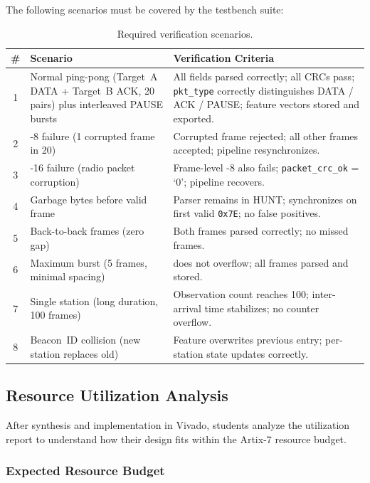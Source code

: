 \documentclass[11pt,letterpaper]{article}
\begin{document}
	The following scenarios must be covered by the testbench suite:

	\begin{table}[ht!]
		\centering
		\caption{Required verification scenarios.}
		\label{tab:scenarios}
		\renewcommand{\arraystretch}{1.3}
		\begin{tabularx}{\textwidth}{c l X}
			\toprule
			\textbf{\#} & \textbf{Scenario} & \textbf{Verification Criteria} \\
			\midrule
			1 & Normal ping-pong (Target~A DATA + Target~B ACK, 20 pairs) plus interleaved PAUSE bursts & All fields parsed correctly; all CRCs pass; \texttt{pkt\_type} correctly distinguishes DATA / ACK / PAUSE; feature vectors stored and exported. \\
			2 & \CRC{}-8 failure (1 corrupted frame in 20) & Corrupted frame rejected; all other frames accepted; pipeline resynchronizes. \\
			3 & \CRC{}-16 failure (radio packet corruption) & Frame-level \CRC{}-8 also fails; \texttt{packet\_crc\_ok} = `0'; pipeline recovers. \\
			4 & Garbage bytes before valid frame & Parser remains in HUNT; synchronizes on first valid \texttt{0x7E}; no false positives. \\
			5 & Back-to-back frames (zero gap) & Both frames parsed correctly; no missed frames. \\
			6 & Maximum burst (5 frames, minimal spacing) & \FIFO{} does not overflow; all frames parsed and stored. \\
			7 & Single station (long duration, 100 frames) & Observation count reaches 100; inter-arrival time stabilizes; no counter overflow. \\
			8 & Beacon~ID collision (new station replaces old) & Feature \BRAM{} overwrites previous entry; per-station state updates correctly. \\
			\bottomrule
		\end{tabularx}
	\end{table}

	\subsection{Resource Utilization Analysis}

	After synthesis and implementation in Vivado, students analyze the utilization report to understand how their design fits within the Artix-7 resource budget.

	\subsubsection{Expected Resource Budget}
\end{document}
